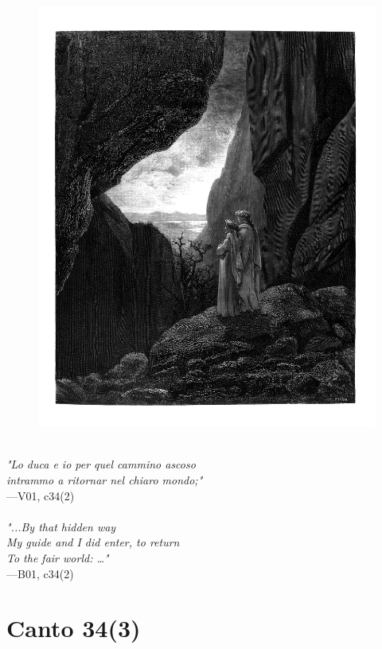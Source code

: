 \documentclass[../Dore_vision.tex]{subfiles}
\begin{document}
\begin{figure}[ht]
\centering
\includegraphics[height=\figsize]{illustrations/book_1/V01, c34(2).jpg}
\end{figure}

\begin{center}
\begin{minipage}{0.8\linewidth}
\textit{\\
"Lo duca e io per quel cammino ascoso\\intrammo a ritornar nel chiaro mondo;"} \\
—V01, c34(2) \\~\\
\textit{"...By that hidden way\\My guide and I did enter, to return\\To the fair world: …"} \\
—B01, c34(2)
\end{minipage}
\end{center}

\newpage

\section{Canto 34(3)}
\end{document}
